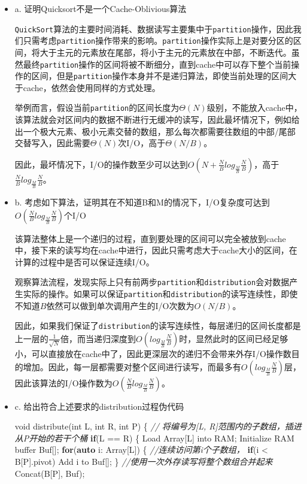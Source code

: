 \documentclass[]{article}
\newenvironment{Shaded}{}{}
\newcommand{\CommentTok}[1]{\textcolor[rgb]{0.38,0.63,0.69}{\textit{#1}}}
\newcommand{\ControlFlowTok}[1]{\textcolor[rgb]{0.00,0.44,0.13}{\textbf{#1}}}
\newcommand{\DataTypeTok}[1]{\textcolor[rgb]{0.56,0.13,0.00}{#1}}
\newcommand{\KeywordTok}[1]{\textcolor[rgb]{0.00,0.44,0.13}{\textbf{#1}}}
\newcommand{\NormalTok}[1]{#1}
\begin{document}
\begin{itemize}
\item
  a. 证明Quicksort不是一个Cache-Oblivious算法

  \texttt{QuickSort}算法的主要时间消耗、数据读写主要集中于\texttt{partition}操作，因此我们只需考虑\texttt{partition}操作带来的影响。\texttt{partition}操作实际上是对要分区的区间，将大于主元的元素放在尾部，将小于主元的元素放在中部，不断迭代。虽然最终\texttt{partition}操作的区间将被不断细分，直到cache中可以存下整个当前操作的区间，但是\texttt{partition}操作本身并不是递归算法，即使当前处理的区间大于cache，依然会使用同样的方式处理。

  举例而言，假设当前\texttt{partition}的区间长度为\(\Theta(N)\)级别，不能放入cache中，该算法就会对区间内的数据不断进行无缓冲的读写，因此最坏情况下，例如给出一个极大元素、极小元素交替的数组，那么每次都需要往数组的中部/尾部交替写入，因此需要\(\Theta(N)\)次I/O，高于\(\Theta(N/B)\)。

  因此，最坏情况下，I/O的操作数至少可以达到\(O(N + \frac{N}{B}log_{\frac{M}{B}}\frac{N}{B})\)，高于\(\frac{N}{B}log_{\frac{M}{B}}\frac{N}{B}\)。
\item
  b.
  考虑如下算法，证明其在不知道B和M的情况下，I/O复杂度可达到\(O(\frac{N}{B}log_{\frac{M}{B}}\frac{N}{B})\)个I/O

  该算法整体上是一个递归的过程，直到要处理的区间可以完全被放到cache中，接下来的读写均在cache中进行，因此只需考虑大于cache大小的区间，在计算的过程中是否可以保证连续I/O。

  观察算法流程，发现实际上只有前两步\texttt{partition}和\texttt{distribution}会对数据产生实际的操作。如果可以保证\texttt{partition}和\texttt{distribution}的读写连续性，即使不知道\(B\)依然可以做到单次调用产生的I/O次数为\(O(N/B)\)。

  因此，如果我们保证了\texttt{distribution}的读写连续性，每层递归的区间长度都是上一层的\(\frac{1}{\sqrt{N}}倍\)，而当递归深度到\(O(log_{\frac{M}{B}}\frac{N}{B})\)时，显然此时的区间已经足够小，可以直接放在cache中了，因此更深层次的递归不会带来外存I/O操作数目的增加。因此，每一层都需要对整个区间进行读写，而最多有\(O(log_{\frac{M}{B}}\frac{N}{B})\)层，因此该算法的I/O操作数为\(O(\frac{N}{B}log_{\frac{M}{B}}\frac{N}{B})\)。
\item
  c. 给出符合上述要求的distribution过程伪代码

\begin{Shaded}
\begin{Highlighting}[]
\DataTypeTok{void}\NormalTok{ distribute(}\DataTypeTok{int}\NormalTok{ L, }\DataTypeTok{int}\NormalTok{ R, }\DataTypeTok{int}\NormalTok{ P) \{}
    \CommentTok{// 将编号为[L, R]范围内的子数组，插进从P开始的若干个桶}
    \ControlFlowTok{if}\NormalTok{(L == R) \{}
\NormalTok{        Load Array[L] into RAM;}
\NormalTok{        Initialize RAM buffer Buf[];}
        \ControlFlowTok{for}\NormalTok{(}\KeywordTok{auto}\NormalTok{ i: Array[L]) \{ }\CommentTok{//连续访问第i个子数组，}
            \ControlFlowTok{if}\NormalTok{(i < B[P].pivot) Add i to Buf[];}
\NormalTok{        \}}
        \CommentTok{//使用一次外存读写将整个数组合并起来}
\NormalTok{        Concat(B[P], Buf);}
        

\end{Highlighting}
\end{Shaded}
\end{itemize}
\end{document}
